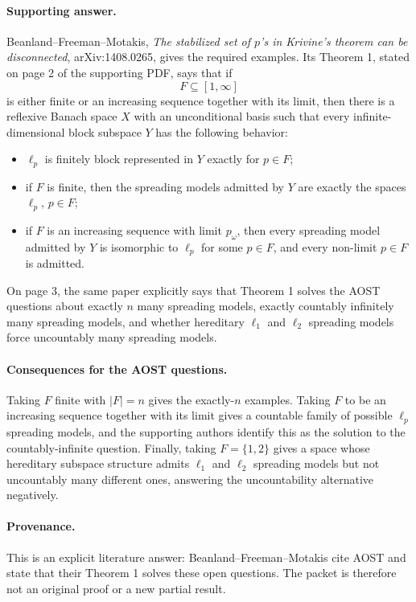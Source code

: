 \documentclass[11pt]{article}
\begin{document}
\paragraph{Supporting answer.}
Beanland--Freeman--Motakis, \emph{The stabilized set of \(p\)'s in Krivine's
theorem can be disconnected}, arXiv:1408.0265, gives the required examples.
Its Theorem 1, stated on page 2 of the supporting PDF, says that if
\[
F\subseteq [1,\infty]
\]
is either finite or an increasing sequence together with its limit, then there
is a reflexive Banach space \(X\) with an unconditional basis such that every
infinite-dimensional block subspace \(Y\) has the following behavior:
\begin{itemize}
\item \(\ell_p\) is finitely block represented in \(Y\) exactly for
\(p\in F\);
\item if \(F\) is finite, then the spreading models admitted by \(Y\) are
exactly the spaces \(\ell_p\), \(p\in F\);
\item if \(F\) is an increasing sequence with limit \(p_\omega\), then every
spreading model admitted by \(Y\) is isomorphic to \(\ell_p\) for some
\(p\in F\), and every non-limit \(p\in F\) is admitted.
\end{itemize}
On page 3, the same paper explicitly says that Theorem 1 solves the AOST
questions about exactly \(n\) many spreading models, exactly countably
infinitely many spreading models, and whether hereditary \(\ell_1\) and
\(\ell_2\) spreading models force uncountably many spreading models.

\paragraph{Consequences for the AOST questions.}
Taking \(F\) finite with \(|F|=n\) gives the exactly-\(n\) examples. Taking
\(F\) to be an increasing sequence together with its limit gives a countable
family of possible \(\ell_p\) spreading models, and the supporting authors
identify this as the solution to the countably-infinite question. Finally,
taking \(F=\{1,2\}\) gives a space whose hereditary subspace structure admits
\(\ell_1\) and \(\ell_2\) spreading models but not uncountably many different
ones, answering the uncountability alternative negatively.

\paragraph{Provenance.}
This is an explicit literature answer: Beanland--Freeman--Motakis cite AOST
and state that their Theorem 1 solves these open questions. The packet is
therefore not an original proof or a new partial result.
\end{document}
